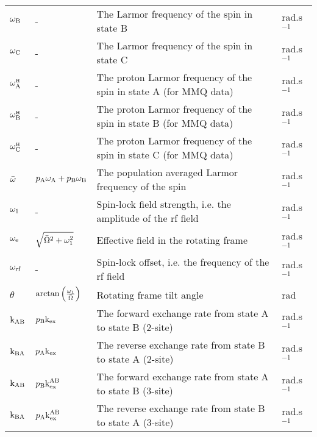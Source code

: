 \begin{landscape}
\begin{center}
\begin{small}
\begin{longtable}{llll}
$\omega_\textrm{B}$          & -                              & The Larmor frequency of the spin in state B                                   & rad.s$^{-1}$ \\
$\omega_\textrm{C}$          & -                              & The Larmor frequency of the spin in state C                                   & rad.s$^{-1}$ \\
$\omega^{\scriptscriptstyle\mathrm{H}}_\textrm{A}$         & -                              & The proton Larmor frequency of the spin in state A (for MMQ data)             & rad.s$^{-1}$ \\
$\omega^{\scriptscriptstyle\mathrm{H}}_\textrm{B}$         & -                              & The proton Larmor frequency of the spin in state B (for MMQ data)             & rad.s$^{-1}$ \\
$\omega^{\scriptscriptstyle\mathrm{H}}_\textrm{C}$         & -                              & The proton Larmor frequency of the spin in state C (for MMQ data)             & rad.s$^{-1}$ \\
$\bar\omega$        & $p_\textrm{A}\omega_\textrm{A} + p_\textrm{B}\omega_\textrm{B}$      & The population averaged Larmor frequency of the spin                          & rad.s$^{-1}$ \\
$\omega_1$        & -                              & Spin-lock field strength, i.e. the amplitude of the rf field                  & rad.s$^{-1}$ \\
$\omega_\textrm{e}$          & $\sqrt{\bar\Omega^2 + \omega_1^2}$  & Effective field in the rotating frame                                   & rad.s$^{-1}$ \\
$\omega_\textrm{rf}$         & -                              & Spin-lock offset, i.e. the frequency of the rf field                          & rad.s$^{-1}$ \\
$\theta$           & $\arctan \left( \frac{\omega_1}{\bar\Omega} \right)$  & Rotating frame tilt angle                             & rad \\
$\textrm{k}_\textrm{AB}$             & $p_\textrm{B}\textrm{k}_\textrm{ex}$                      & The forward exchange rate from state A to state B (2-site)                    & rad.s$^{-1}$ \\
$\textrm{k}_\textrm{BA}$             & $p_\textrm{A}\textrm{k}_\textrm{ex}$                      & The reverse exchange rate from state B to state A (2-site)                    & rad.s$^{-1}$ \\
$\textrm{k}_\textrm{AB}$             & $p_\textrm{B}\textrm{k}_\textrm{ex}^\textrm{AB}$                    & The forward exchange rate from state A to state B (3-site)                    & rad.s$^{-1}$ \\
$\textrm{k}_\textrm{BA}$             & $p_\textrm{A}\textrm{k}_\textrm{ex}^\textrm{AB}$                    & The reverse exchange rate from state B to state A (3-site)                    & rad.s$^{-1}$ \\

\end{longtable}
\end{small}
\end{center}
\end{landscape}
